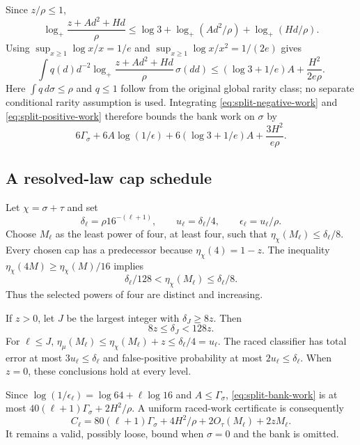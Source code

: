 Since $z/\rho\le1$,
\[
 \log_+\frac{z+Ad^2+Hd}{\rho}
 \le\log3+\log_+(Ad^2/\rho)+\log_+(Hd/\rho).
\]
Using $\sup_{x\ge1}\log x/x=1/e$ and
$\sup_{x\ge1}\log x/x^2=1/(2e)$ gives
\begin{equation}\label{eq:split-surcharge}
 \int q(d)d^{-2}\log_+\frac{z+Ad^2+Hd}{\rho}\,\sigma(dd)
 \le(\log3+1/e)A+\frac{H^2}{2e\rho}.
\end{equation}
Here $\int q\,d\sigma\le\rho$ and $q\le1$ follow from the original
global rarity class; no separate conditional rarity assumption is used.
Integrating \eqref{eq:split-negative-work} and
\eqref{eq:split-positive-work} therefore bounds the bank work on $\sigma$ by
\begin{equation}\label{eq:split-bank-work}
 6\Gamma_\sigma+6A\log(1/\epsilon)
       +6(\log3+1/e)A+\frac{3H^2}{e\rho}.
\end{equation}

\subsection{A resolved-law cap schedule}

Let $\chi=\sigma+\tau$ and set
\[
 \delta_\ell=\rho16^{-(\ell+1)},\qquad
 u_\ell=\delta_\ell/4,\qquad \epsilon_\ell=u_\ell/\rho.
\]
Choose $M_\ell$ as the least power of four, at least four, such that
$\eta_\chi(M_\ell)\le\delta_\ell/8$.
Every chosen cap has a predecessor because $\eta_\chi(4)=1-z$.
The inequality $\eta_\chi(4M)\ge\eta_\chi(M)/16$ implies
\begin{equation}\label{eq:split-cap-selection}
 \delta_\ell/128<\eta_\chi(M_\ell)\le\delta_\ell/8.
\end{equation}
Thus the selected powers of four are distinct and increasing.

If $z>0$, let $J$ be the largest integer with $\delta_J\ge8z$.
Then
\begin{equation}\label{eq:split-terminal-level}
 8z\le\delta_J<128z.
\end{equation}
For $\ell\le J$,
$\eta_\mu(M_\ell)\le\eta_\chi(M_\ell)+z\le\delta_\ell/4=u_\ell$.
The raced classifier has total error at most $3u_\ell\le\delta_\ell$
and false-positive probability at most $2u_\ell\le\delta_\ell$.
When $z=0$, these conclusions hold at every level.

Since $\log(1/\epsilon_\ell)=\log64+\ell\log16$ and
$A\le\Gamma_\sigma$, \eqref{eq:split-bank-work} is at most
$40(\ell+1)\Gamma_\sigma+2H^2/\rho$.
A uniform raced-work certificate is consequently
\begin{equation}\label{eq:split-level-work}
 C_\ell=80(\ell+1)\Gamma_\sigma+4H^2/\rho
                  +2O_\tau(M_\ell)+2zM_\ell.
\end{equation}
It remains a valid, possibly loose, bound when $\sigma=0$ and the bank is
omitted.

